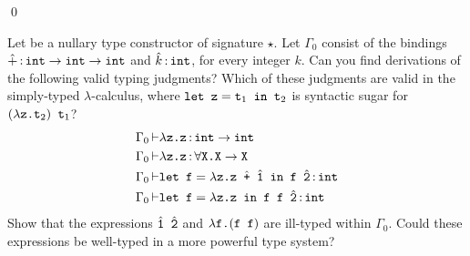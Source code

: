 \documentclass{amsart}
\begin{document}
\begin{solution}
  \begin{prooftree}
  \end{prooftree}
  \qed
\end{solution}

\begin{problem}
  Let  be a nullary type constructor of signature \(\star\). Let
  \(\Gamma_0\) consist of the bindings \(\hat{+} \inhabits \mono{int} \to
  \mono{int} \to \mono{int}\) and \(\hat{k} \inhabits \mono{int}\), for every
  integer \(k\).  Can you find derivations of the following valid typing
  judgments? Which of these judgments are valid in the simply-typed
  \(\lambda\)-calculus, where \(\mono{let z} = \mono{t}_1 \mono{ in t}_2\) is
  syntactic sugar for \((\lambda \mono{z.t}_2) \mono{ t}_1\)?
  \begin{align*}
    \Gamma_0 \entails& \lambda \mono{z.z} \inhabits \mono{int} \to \mono{int} \\
    \Gamma_0 \entails& \lambda \mono{z.z} \inhabits \forall \mono{X.X} \to
      \mono{X} \\
    \Gamma_0 \entails& \mono{let f} = \lambda \mono{z.z } \hat{\mono{+}}
      \mono{ } \hat{\mono{1}} \mono{ in f } \hat{\mono{2}} \inhabits
      \mono{int} \\
    \Gamma_0 \entails& \mono{let f} = \lambda \mono{z.z} \mono{ in f f }
      \hat{\mono{2}} \inhabits \mono{int}
  \end{align*}
  Show that the expressions \(\hat{\mono{1}} \mono{ } \hat{\mono{2}}\) and
  \(\lambda \mono{f.} (\mono{f f})\) are ill-typed within \(\Gamma_0\). Could
  these expressions be well-typed in a more powerful type system?
\end{problem}
\end{document}
